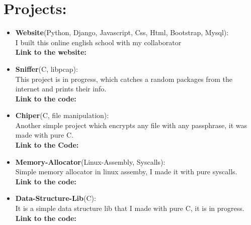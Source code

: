 \documentclass{article}
\begin{document}
\begin{minipage}[t]{8cm}
  \vspace*{-2cm}
  
\section*{Projects:}
\begin{itemize}
  \setlength\itemsep{0.01cm}
\item \textbf{Website}(Python, Django, Javascript, Css, Html, Bootstrap, Mysql):\\
  I built this online english school with my collaborator \href{https://github.com/oscara1796}{\color{blue}{oscara1796}}\\
  \textbf{Link to the website:} \href{https://ilearn-demo.herokuapp.com/}{\color{Blue}{WebSite}}
\item \textbf{Sniffer}(C, libpcap):\\
  This project is in progress, which catches a random packages from the internet and prints their info.\\
  \textbf{Link to the code:} \href{https://github.com/alecksandr26/sniffer}{\color{Blue}{GitHub}}
\item \textbf{Chiper}(C, file manipulation): \\
  Another simple project which encrypts any file with any passphrase, it was made with pure C.\\
  \textbf{Link to the Code:} \href{https://github.com/alecksandr26/cipher}{\color{Blue}{GitHub}}
\item \textbf{Memory-Allocator}(Linux-Assembly, Syscalls):\\
  Simple memory allocator in linux assemby, I made it with pure syscalls.\\
  \textbf{Link to the code:} \href{https://github.com/alecksandr26/Memory-Allocator-In-Nasm}{\color{Blue}{GitHub}}
\item \textbf{Data-Structure-Lib}(C):\\
  It is a simple data structure lib that I made with pure C, it is in progress.\\
  \textbf{Link to the code:} \href{https://github.com/alecksandr26/Data-structure-lib}{\color{Blue}{GitHub}}
\end{itemize}


\end{minipage}
\end{document}
